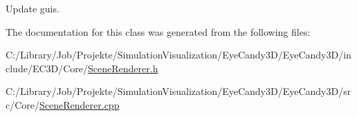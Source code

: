 Update guis. 



The documentation for this class was generated from the following files\+:\begin{DoxyCompactItemize}
\item 
C\+:/\+Library/\+Job/\+Projekte/\+Simulation\+Visualization/\+Eye\+Candy3\+D/\+Eye\+Candy3\+D/include/\+E\+C3\+D/\+Core/\mbox{\hyperlink{_scene_renderer_8h}{Scene\+Renderer.\+h}}\item 
C\+:/\+Library/\+Job/\+Projekte/\+Simulation\+Visualization/\+Eye\+Candy3\+D/\+Eye\+Candy3\+D/src/\+Core/\mbox{\hyperlink{_scene_renderer_8cpp}{Scene\+Renderer.\+cpp}}\end{DoxyCompactItemize}
